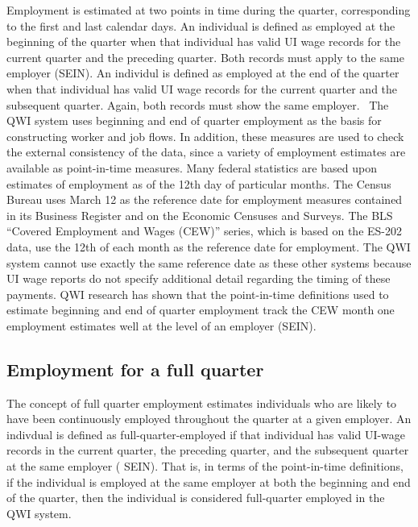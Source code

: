 Employment is estimated at two points in time during the quarter,
corresponding to the first and last calendar days. An individual is defined
as employed at the beginning of the quarter when that individual has valid %
UI wage records for the current quarter and the preceding
quarter.  Both records must apply to the same employer (SEIN).
An individul is defined as employed at the end of the quarter when that
individual has valid {UI} wage records for the current quarter and the
subsequent quarter. Again, both records must show the same employer. \ The
QWI system uses beginning and end of quarter employment as the basis for
constructing worker and job flows. In addition, these measures are used to
check the external consistency of the data, since a variety of employment
estimates are available as point-in-time measures. Many federal statistics
are based upon estimates of employment as of the 12th day of particular
months. The Census Bureau uses March 12 as the reference date for
employment measures contained in its Business Register and on the Economic
Censuses and Surveys.  The BLS ``Covered Employment and Wages
(CEW)'' series, which is based on the ES-202
data, use the 12th of each month as the reference date for employment. The
QWI system cannot use exactly the same reference date as these other
systems because {UI} wage reports do not specify additional detail
regarding the timing of these payments. QWI research has shown that the
point-in-time definitions used to estimate beginning and end of quarter
employment track the CEW month one employment estimates well at the level
of an employer ({SEIN}).

\subsection{Employment for a full quarter}


The concept of full quarter employment estimates individuals who are likely
to have been continuously employed throughout the quarter at a given
employer. An indivdual is defined as full-quarter-employed if that
individual has valid UI-wage records in the current quarter, the
preceding quarter, and the subsequent quarter at the same employer (%
SEIN). That is, in terms of the point-in-time definitions, if the
individual is employed at the same employer at both the beginning and end of
the quarter, then the individual is considered full-quarter employed in the
QWI system. 

